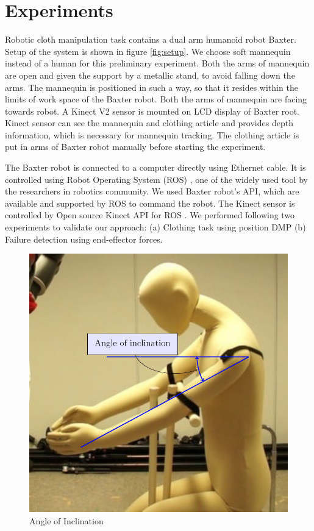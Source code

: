\documentclass[sigconf]{acmart}
\begin{document}
\section{Experiments}
\label{sec:experiments}
Robotic cloth manipulation task contains a dual arm humanoid robot Baxter. Setup of the system is shown in figure \ref{fig:setup}. We choose soft mannequin instead of a human for this preliminary experiment. Both the arms of mannequin are open and  given the support by a metallic stand, to avoid falling down the arms. The mannequin is positioned in such a way, so that it resides within the limits of work space of the Baxter robot. Both the arms of mannequin are facing towards robot. A Kinect V2 \cite{microsoft2014kinect} sensor is mounted on LCD display of Baxter root. Kinect sensor can see the mannequin and clothing article and provides depth information, which is necessary for mannequin tracking. The clothing article is put in arms of Baxter robot manually before starting the experiment.

The Baxter robot is connected to a computer directly using Ethernet cable. It is controlled using Robot Operating System (ROS) \cite{quigley2009ros}, one of the widely used tool by the researchers in robotics community. We used Baxter robot's API, which are available and supported by ROS to command the robot. The Kinect sensor is controlled by Open source Kinect API for ROS \cite{iai_kinect2, libfreenect2}. We performed following two experiments to validate our approach: (a) Clothing task using position DMP (b) Failure detection using end-effector forces.

\begin{figure}
	\includegraphics[width=0.7\linewidth]{inclination}
	\caption{Angle of Inclination}
	\label{fig:inclination}
\end{figure}
\end{document}
